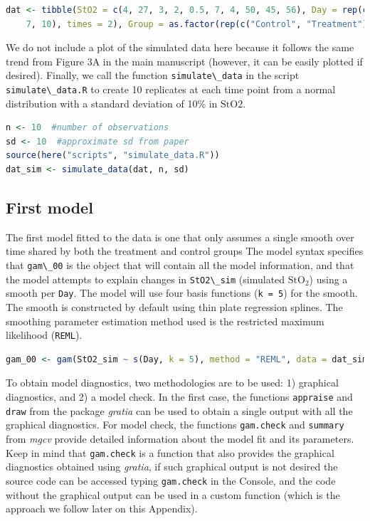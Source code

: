 \documentclass[
]{article}
\newcommand{\passthrough}[1]{#1}
\begin{document}
\begin{lstlisting}[language=R]
dat <- tibble(StO2 = c(4, 27, 3, 2, 0.5, 7, 4, 50, 45, 56), Day = rep(c(0, 2, 5,
    7, 10), times = 2), Group = as.factor(rep(c("Control", "Treatment"), each = 5)))
\end{lstlisting}

We do not include a plot of the simulated data here because it follows the same trend from Figure 3A in the main manuscript (however, it can be easily plotted if desired).
Finally, we call the function \passthrough{\lstinline!simulate\_data!} in the script \passthrough{\lstinline!simulate\_data.R!} to create 10 replicates at each time point from a normal distribution with a standard deviation of 10\% in \(\mbox{StO2}\).

\begin{lstlisting}[language=R]
n <- 10  #number of observations
sd <- 10  #approximate sd from paper
source(here("scripts", "simulate_data.R"))
dat_sim <- simulate_data(dat, n, sd)
\end{lstlisting}

\hypertarget{first-model}{%
\subsection{First model}\label{first-model}}

The first model fitted to the data is one that only assumes a single smooth over time shared by both the treatment and control groups The model syntax specifies that \passthrough{\lstinline!gam\_00!} is the object that will contain all the model information, and that the model attempts to explain changes in \passthrough{\lstinline!StO2\_sim!} (simulated \(\mbox{StO}_2\)) using a smooth per \passthrough{\lstinline!Day!}. The model will use four basis functions (\passthrough{\lstinline!k = 5!}) for the smooth. The smooth is constructed by default using thin plate regression splines. The smoothing parameter estimation method used is the restricted maximum likelihood (\passthrough{\lstinline!REML!}).

\begin{lstlisting}[language=R]
gam_00 <- gam(StO2_sim ~ s(Day, k = 5), method = "REML", data = dat_sim)
\end{lstlisting}

To obtain model diagnostics, two methodologies are to be used: 1) graphical diagnostics, and 2) a model check. In the first case, the functions \passthrough{\lstinline!appraise!} and \passthrough{\lstinline!draw!} from the package \emph{gratia} can be used to obtain a single output with all the graphical diagnostics. For model check, the functions \passthrough{\lstinline!gam.check!} and \passthrough{\lstinline!summary!} from \emph{mgcv} provide detailed information about the model fit and its parameters. Keep in mind that \passthrough{\lstinline!gam.check!} is a function that also provides the graphical diagnostics obtained using \emph{gratia}, if such graphical output is not desired the source code can be accessed typing \passthrough{\lstinline!gam.check!} in the Console, and the code without the graphical output can be used in a custom function (which is the approach we follow later on this Appendix).
\end{document}
